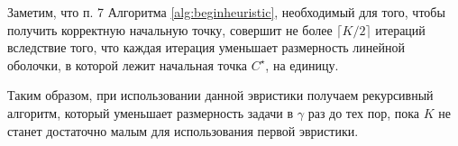 \documentclass[10pt]{article}
\DeclareMathOperator*{\argmax}{arg\,max}
\newtheorem{theorem}{Теорема}
\begin{document}
Заметим, что п. 7 Алгоритма \ref{alg:beginheuristic}, необходимый для того, чтобы получить корректную начальную точку, совершит не более $\lceil K/2 \rceil$ итераций вследствие того, что каждая итерация уменьшает размерность линейной оболочки, в которой лежит начальная точка $C^\star$, на единицу.

Таким образом, при использовании данной эвристики получаем рекурсивный алгоритм, который уменьшает размерность задачи в $\gamma$ раз до тех пор, пока $K$ не станет достаточно малым для использования первой эвристики.
%	
%		
%		
\end{document}
